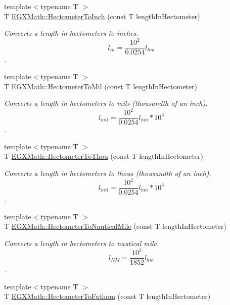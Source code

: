 \begin{DoxyCompactItemize}
{\footnotesize template$<$typename T $>$ }\\T \mbox{\hyperlink{group___e_g_x_math-_conversions-_length_conversions-_s_i-_hectometer-_imperial_ga21fd4a7228c229b0b229fd0fab224998}{E\+G\+X\+Math\+::\+Hectometer\+To\+Inch}} (const T length\+In\+Hectometer)
\begin{DoxyCompactList}\small\item\em Converts a length in hectometers to inches. \[ l_{in}= \frac{10^{2}}{0.0254} l_{hm} \]. \end{DoxyCompactList}\item 
{\footnotesize template$<$typename T $>$ }\\T \mbox{\hyperlink{group___e_g_x_math-_conversions-_length_conversions-_s_i-_hectometer-_imperial_ga117bf04e7f132a33598fa098a8b7c17e}{E\+G\+X\+Math\+::\+Hectometer\+To\+Mil}} (const T length\+In\+Hectometer)
\begin{DoxyCompactList}\small\item\em Converts a length in hectometers to mils (thousandth of an inch). \[ l_{mil}= \frac{10^{2}}{0.0254} l_{hm} * 10^{3} \]. \end{DoxyCompactList}\item 
{\footnotesize template$<$typename T $>$ }\\T \mbox{\hyperlink{group___e_g_x_math-_conversions-_length_conversions-_s_i-_hectometer-_imperial_gabfd81bd5bb9e8293005c23794f541a1c}{E\+G\+X\+Math\+::\+Hectometer\+To\+Thou}} (const T length\+In\+Hectometer)
\begin{DoxyCompactList}\small\item\em Converts a length in hectometers to thous (thousandth of an inch). \[ l_{mil}= \frac{10^{2}}{0.0254} l_{hm} * 10^{3} \]. \end{DoxyCompactList}\item 
{\footnotesize template$<$typename T $>$ }\\T \mbox{\hyperlink{group___e_g_x_math-_conversions-_length_conversions-_s_i-_hectometer-_nautical_ga74e84be72b4e2272d547b5d7e21211dc}{E\+G\+X\+Math\+::\+Hectometer\+To\+Nautical\+Mile}} (const T length\+In\+Hectometer)
\begin{DoxyCompactList}\small\item\em Converts a length in hectometers to nautical mile. \[ l_{NM}= \frac{10^{2}}{1852} l_{hm} \]. \end{DoxyCompactList}\item 
{\footnotesize template$<$typename T $>$ }\\T \mbox{\hyperlink{group___e_g_x_math-_conversions-_length_conversions-_s_i-_hectometer-_nautical_ga487d637d16d2468a9969ab3a4f50eeb1}{E\+G\+X\+Math\+::\+Hectometer\+To\+Fathom}} (const T length\+In\+Hectometer)

\end{DoxyCompactItemize}
